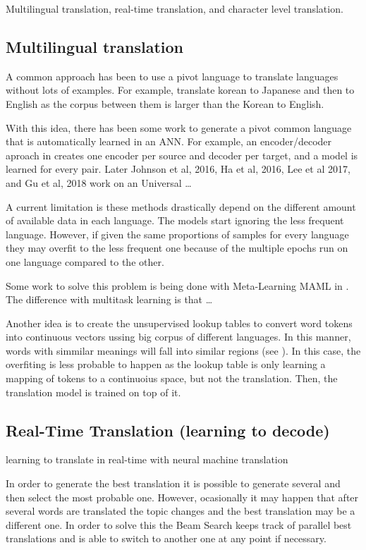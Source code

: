 Multilingual translation, real-time translation, and character level
translation.

\subsection{Multilingual translation}

A common approach has been to use a pivot language to translate languages
without lots of examples. For example, translate korean to Japanese and then to
English as the corpus between them is larger than the Korean to English.

With this idea, there has been some work to generate a pivot common language
that is automatically learned in an \gls{ANN}. For example, an encoder/decoder
aproach in \cite{firat2016multi, firat2016zero} creates one encoder per source
and decoder per target, and a model is learned for every pair. Later Johnson et
al, 2016, Ha et al, 2016, Lee et al 2017, and Gu et al, 2018 work on an
Universal \dots

A current limitation is these methods drastically depend on the different
amount of available data in each language. The models start ignoring the less
frequent language. However, if given the same proportions of samples for every
language they may overfit to the less frequent one because of the multiple epochs
run on one language compared to the other.

Some work to solve this problem is being done with Meta-Learning MAML in
\cite{finn2017model}. The difference with multitask learning is that  \dots

Another idea is to create the unsupervised lookup tables to convert word tokens
into continuous vectors ussing big corpus of different languages. In this
manner, words with simmilar meanings will fall into similar regions (see
\cite{artetxe2017unsupervised}). In this case, the overfiting is less probable
to happen as the lookup table is only learning a mapping of tokens to a
continuoius space, but not the translation. Then, the translation model is
trained on top of it.

\subsection{Real-Time Translation (learning to decode)}

learning to translate in real-time with neural machine translation
\cite{gu2016learning}

In order to generate the best translation it is possible to generate several
and then select the most probable one. However, ocasionally it may happen that
after several words are translated the topic changes and the best translation
may be a different one. In order to solve this the Beam Search keeps track of
parallel best translations and is able to switch to another one at any point if
necessary.

